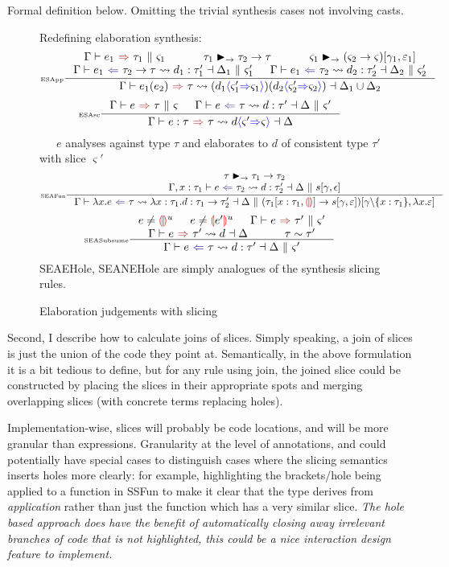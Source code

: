 \par Formal definition below. Omitting the trivial synthesis cases not involving casts.
\begin{figure}[H]
\small
Redefining elaboration synthesis:
\tiny
\[\inference[\tiny ESApp]{\synthesisSlice{e_1}{\tau_1}{\varsigma_1} & \tau_1 \funmatch \tau_2 \to \tau & \varsigma_1 \funmatch (\varsigma_2 \to \varsigma)[\gamma_1, \varepsilon_1]\\
\elaborationAnalysisSlice{e_1}{\tau_2 \to \tau}{d_1}{\tau_1'}{\Delta_1}{\varsigma_1'} & \elaborationAnalysisSlice{e_1}{\tau_2}{d_2}{\tau_2'}{\Delta_2}{\varsigma_2'}}{\elaborationSynthesis{e_1(e_2)}{\tau}{(d_1\scast{\varsigma_1'}{\varsigma_1})(d_2\scast{\varsigma_2'}{\varsigma_2})}{\Delta_1 \cup \Delta_2}}
\]
\[\inference[\tiny ESAsc]{\synthesisSlice{e}{\tau}{\varsigma} & \elaborationAnalysisSlice{e}{\tau}{d}{\tau'}{\Delta}{\varsigma'}}{\elaborationSynthesis{e:\tau}{\tau}{d\scast{\varsigma'}{\varsigma}}{\Delta}}\]
\small
{}\ \ \ $e$ analyses against type $\tau$ and elaborates to $d$ of consistent type $\tau'$ with slice $\varsigma'$
\tiny
\[
\inference[\tiny SEAFun]{\tau \funmatch \tau_1 \to \tau_2 \\ \elaborationAnalysisSlice[\Gamma,x:\tau_1]{e}{\tau_2}{d}{\tau_2'}{\Delta}{s[\gamma, \epsilon]}}{\elaborationAnalysisSlice{\lambda x. e}{\tau}{\lambda x:\tau_1. d}{\tau_1 \to \tau_2'}{\Delta}(\tau_1[x:\tau_1,\hole] \to s[\gamma, \varepsilon])[\gamma\backslash\{x:\tau_1\},\lambda x. \varepsilon]}
\]
\[
\inference[\tiny SEASubsume]{e \neq \hole^u & e \neq \hole[e']^u & \synthesisSlice{e}{\tau'}{\varsigma'}\\ \elaborationSynthesis{e}{\tau'}{d}{\Delta} & \tau \sim \tau'}{\elaborationAnalysisSlice{e}{\tau}{d}{\tau'}{\Delta}{\varsigma'}}
\]
\center
SEAEHole, SEANEHole are simply analogues of the synthesis slicing rules.
\caption{Elaboration judgements with slicing}
\label{fig:elaborationsliced}
\end{figure}

Second, I describe how to calculate joins of slices. Simply speaking, a join of slices is just the union of the code they point at. Semantically, in the above formulation it is a bit tedious to define, but for any rule using join, the joined slice could be constructed by placing the slices in their appropriate spots and merging overlapping slices (with concrete terms replacing holes).
\par 
Implementation-wise, slices will probably be code locations, and will be more granular than expressions. Granularity at the level of annotations, and could potentially have special cases to distinguish cases where the slicing semantics inserts holes more clearly: for example, highlighting the brackets/hole being applied to a function in SSFun to make it clear that the type derives from \textit{application} rather than just the function which has a very similar slice. \textit{The hole based approach does have the benefit of automatically closing away irrelevant branches of code that is not highlighted, this could be a nice interaction design feature to implement.}

